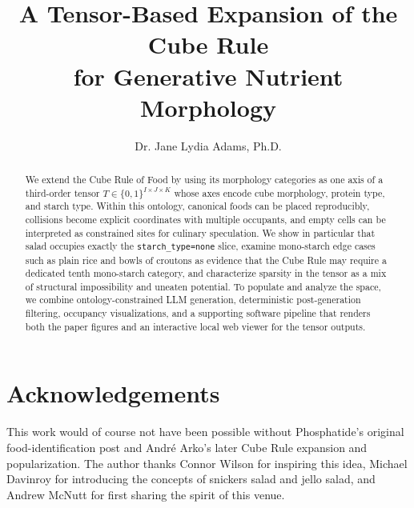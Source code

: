 \documentclass[11pt,letterpaper,twocolumn]{article}
\title{A Tensor-Based Expansion of the Cube Rule\\for Generative Nutrient Morphology}
\author{Dr. Jane Lydia Adams, Ph.D.}
\date{}
\begin{document}

\maketitle

\begin{abstract}
We extend the Cube Rule of Food by using its morphology categories as one axis of a third-order tensor $T \in \{0,1\}^{I \times J \times K}$ whose axes encode cube morphology, protein type, and starch type.
Within this ontology, canonical foods can be placed reproducibly, collisions become explicit coordinates with multiple occupants, and empty cells can be interpreted as constrained sites for culinary speculation.
We show in particular that salad occupies exactly the \texttt{starch\_type=none} slice, examine mono-starch edge cases such as plain rice and bowls of croutons as evidence that the Cube Rule may require a dedicated tenth mono-starch category, and characterize sparsity in the tensor as a mix of structural impossibility and uneaten potential.
To populate and analyze the space, we combine ontology-constrained LLM generation, deterministic post-generation filtering, occupancy visualizations, and a supporting software pipeline that renders both the paper figures and an interactive local web viewer for the tensor outputs.
\end{abstract}









\section*{Acknowledgements}
This work would of course not have been possible without Phosphatide's original food-identification post and André Arko's later Cube Rule expansion and popularization. The author thanks Connor Wilson for inspiring this idea, Michael Davinroy for introducing the concepts of snickers salad and jello salad, and Andrew McNutt for first sharing the spirit of this venue.



\end{document}
